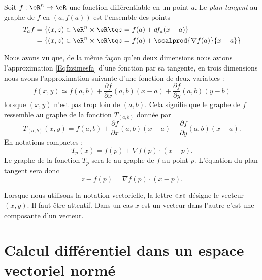 \begin{definition}
  Soit $f : \eR^n \to\eR$ une fonction différentiable en un point
  $a$. Le \emph{plan tangent} au graphe de $f$ en $(a,f(a))$ est
  l'ensemble des points
  \begin{equation*}
    \begin{split}
      T_af &= \{ (x,z) \in \eR^n \times \eR \tq z = f(a) + d f_a (x-a)\}\\
      &= \{ (x,z) \in \eR^n \times \eR \tq z = f(a) + \scalprod{\nabla f(a)}{x-a}\}
    \end{split}
  \end{equation*}
\end{definition}

Nous avons vu que, de la même façon qu'en deux dimensions nous avions l'approximation \eqref{Eqfxsimesfa} d'une fonction par sa tangente, en trois dimensions nous avons l'approximation suivante d'une fonction de deux variables :
\begin{equation}
    f(x,y)\simeq f(a,b)+\frac{ \partial f }{ \partial x }(a,b)(x-a)+\frac{ \partial f }{ \partial y }(a,b)(y-b)
\end{equation}
lorsque $(x,y)$ n'est pas trop loin de $(a,b)$. Cela signifie que le graphe de $f$ ressemble au graphe de la fonction $T_{(a,b)}$ donnée par
\begin{equation}
    T_{(a,b)}(x,y)=f(a,b)+\frac{ \partial f }{ \partial x }(a,b)(x-a)+\frac{ \partial f }{ \partial y }(a,b)(x-a).
\end{equation}
En notations compactes :
\begin{equation}
    T_p(x)=f(p)+\nabla f(p)\cdot (x-p).
\end{equation}
Le graphe de la fonction $T_p$ sera le  au graphe de $f$ au point $p$. L'équation du plan tangent sera donc
\begin{equation}
    z-f(p)=\nabla f(p)\cdot (x-p).
\end{equation}

\begin{remark}
    Lorsque nous utilisons la notation vectorielle, la lettre «$x$» désigne le vecteur $(x,y)$. Il faut être attentif. Dans un cas $x$ est un vecteur dans l'autre c'est une composante d'un vecteur.
\end{remark}

\section{Calcul différentiel dans un espace vectoriel normé}
\label{SecLStKEmc}


